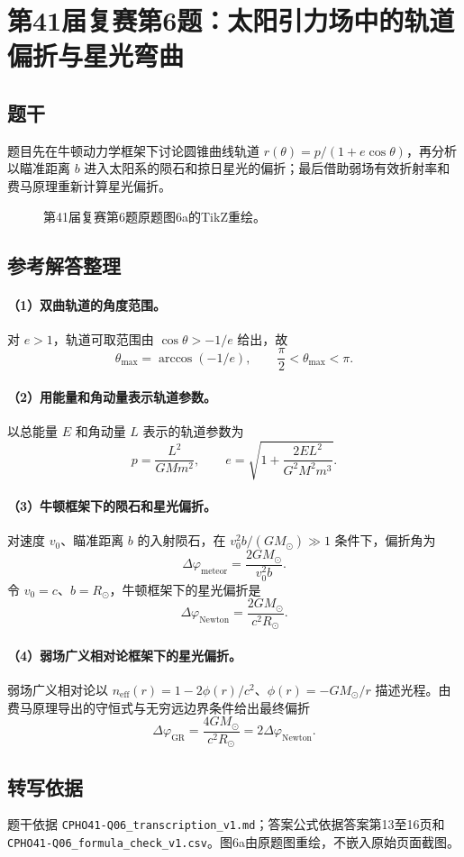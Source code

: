 \section{第41届复赛第6题：太阳引力场中的轨道偏折与星光弯曲}
\subsection{题干}
题目先在牛顿动力学框架下讨论圆锥曲线轨道 $r(\theta)=p/(1+e\cos\theta)$，再分析以瞄准距离 $b$ 进入太阳系的陨石和掠日星光的偏折；最后借助弱场有效折射率和费马原理重新计算星光偏折。
\begin{figure}[htbp]\centering\caption{第41届复赛第6题原题图6a的TikZ重绘。}\end{figure}
\subsection{参考解答整理}
\paragraph{（1）双曲轨道的角度范围。}
对 $e>1$，轨道可取范围由 $\cos\theta>-1/e$ 给出，故
\[\theta_{\max}=\arccos(-1/e),\qquad \frac\pi2<\theta_{\max}<\pi.\]
\paragraph{（2）用能量和角动量表示轨道参数。}
以总能量 $E$ 和角动量 $L$ 表示的轨道参数为
\[p=\frac{L^2}{GMm^2},\qquad e=\sqrt{1+\frac{2EL^2}{G^2M^2m^3}}.\]
\paragraph{（3）牛顿框架下的陨石和星光偏折。}
对速度 $v_0$、瞄准距离 $b$ 的入射陨石，在 $v_0^2b/(GM_\odot)\gg1$ 条件下，偏折角为
\[\boxed{\Delta\varphi_{\mathrm{meteor}}=\frac{2GM_\odot}{v_0^2b}}.\]
令 $v_0=c$、$b=R_\odot$，牛顿框架下的星光偏折是
\[\Delta\varphi_{\mathrm{Newton}}=\frac{2GM_\odot}{c^2R_\odot}.\]
\paragraph{（4）弱场广义相对论框架下的星光偏折。}
弱场广义相对论以 $n_{\mathrm{eff}}(r)=1-2\phi(r)/c^2$、$\phi(r)=-GM_\odot/r$ 描述光程。由费马原理导出的守恒式与无穷远边界条件给出最终偏折
\[\boxed{\Delta\varphi_{\mathrm{GR}}=\frac{4GM_\odot}{c^2R_\odot}=2\Delta\varphi_{\mathrm{Newton}}}.\]
\subsection{转写依据}
题干依据 \texttt{CPHO41-Q06\_transcription\_v1.md}；答案公式依据答案第13至16页和 \texttt{CPHO41-Q06\_formula\_check\_v1.csv}。图6a由原题图重绘，不嵌入原始页面截图。
